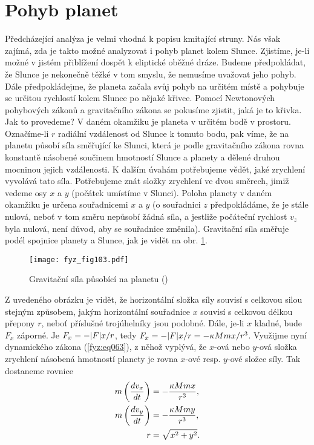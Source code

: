   \section{Pohyb planet}
    Předcházející analýza je velmi vhodná k popisu kmitající stru\-ny. Nás však zajímá, zda je 
    takto 
    možné analyzovat i pohyb planet kolem Slunce. Zjistíme, je-li možné v jistém přiblížení dospět 
    k eliptické oběžné dráze. Budeme předpokládat, že Slunce je nekonečně těžké v tom smyslu, že 
    nemusíme uvažovat jeho pohyb. Dále předpokládejme, že planeta začala svůj pohyb na určitém 
    místě a pohybuje se určitou rychlostí kolem Slunce po nějaké křivce. Pomocí Newtonových 
    pohybových zákonů a gravitačního zákona se pokusíme zjistit, jaká je to křivka. Jak to 
    provedeme? V daném okamžiku je planeta v určitém bodě v prostoru. Označíme-li \(r\) radiální 
    vzdálenost od Slunce k tomuto bodu, pak víme, že na planetu působí síla směřující ke Slunci, 
    která je podle gravitačního zákona rovna konstantě násobené součinem hmotností Slunce a planety 
    a dělené druhou mocninou jejich vzdálenosti. K dalším úvahám potřebujeme vědět, jaké zrychlení 
    vyvolává tato síla. Potřebujeme znát složky zrychlení ve dvou směrech, jimiž vedeme osy \(x\) a 
    \(y\) (počátek umístíme v Slunci). Poloha planety v daném okamžiku je určena souřadnicemi \(x\) 
    a \(y\) (o souřadnici \(z\) předpokládáme, že je stále nulová, neboť v tom směru nepůsobí žádná 
    síla, a jestliže počáteční rychlost \(v_z\) byla nulová, není důvod, aby se souřadnice 
    změnila). Gravitační síla směřuje podél spojnice planety a Slunce, jak je vidět na obr. 
    \ref{fyz:fig103}.

    \begin{figure}[ht!]  %
      \centering
      \texttt{[image: fyz\_fig103.pdf]}
      \caption{Gravitační síla působící na planetu (\cite[s.~131]{Feynman01})}
      \label{fyz:fig103}
    \end{figure}
    Z uvedeného obrázku je vidět, že horizontální složka síly souvisí s celkovou silou stejným 
    způsobem, jakým horizontální souřadnice \(x\) souvisí s celkovou délkou přepony \(r\), neboť 
    příslušné trojúhelníky jsou podobné. Dále, je-li \(x\) kladné, bude \(F_x\) záporné. Je \(F_x = 
    -\lvert F\rvert x/r\), tedy \(F_x = -\lvert F\rvert x/r = -\kappa Mmx/r^3\). Využijme nyní dynamického zákona 
    (\ref{fyz:eq063}), z něhož vyplývá, že \(x\)-ová nebo \(y\)-ová složka zrychlení násobená 
    hmotností planety je rovna \(x\)-ové resp. \(y\)-ové složce síly. Tak dostaneme rovnice
    \begin{subequations}
    \label{FYZ:eq133}
    \begin{align} 
      m\left(\dfrac{d v_x}{d t}\right) &= -\frac{\kappa Mmx}{r^3}, \label{FYZ:eq133a}   \\
      m\left(\dfrac{d v_y}{d t}\right) &= -\frac{\kappa Mmy}{r^3}, \label{FYZ:eq133b}   \\
                               r &= \sqrt{x^2+y^2}.          \label{FYZ:eq133c} 
    \end{align}
    \end{subequations}
    
